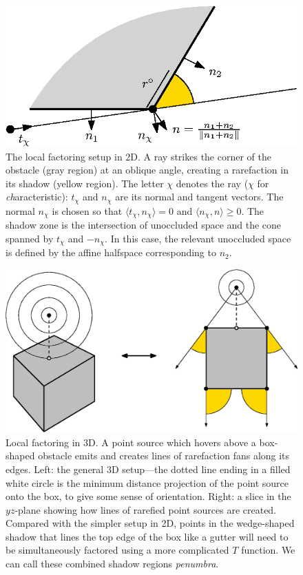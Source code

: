 \documentclass{article}
\begin{document}
\begin{figure}[t]
  \centering
  \includegraphics{2d-factoring.eps}
  \caption{The local factoring setup in 2D. A ray strikes the corner
    of the obstacle (gray region) at an oblique angle, creating a
    rarefaction in its shadow (yellow region). The letter $\chi$
    denotes the ray ($\chi$ for \emph{ch}aracteristic): $t_\chi$ and
    $n_\chi$ are its normal and tangent vectors. The normal $n_\chi$
    is chosen so that $\langle t_\chi, n_\chi \rangle = 0$ and
    $\langle n_\chi, n \rangle \geq 0$. The shadow zone is the
    intersection of unoccluded space and the cone spanned by $t_\chi$
    and $-n_\chi$. In this case, the relevant unoccluded space is
    defined by the affine halfspace corresponding to
    $n_2$.}\label{fig:2d-factoring}
\end{figure}

\begin{figure}[t]
  \centering
  \includegraphics[width=0.8\linewidth]{3d-factoring.eps}
  \caption{Local factoring in 3D. A point source which hovers above a
    box-shaped obstacle emits and creates lines of rarefaction fans
    along its edges. Left: the general 3D setup---the dotted line
    ending in a filled white circle is the minimum distance projection
    of the point source onto the box, to give some sense of
    orientation. Right: a slice in the $yz$-plane showing how lines of
    rarefied point sources are created. Compared with the simpler
    setup in 2D, points in the wedge-shaped shadow that lines the top
    edge of the box like a gutter will need to be simultaneously
    factored using a more complicated $T$ function. We can call these
    combined shadow regions \emph{penumbra}.}\label{fig:3d-factoring}
\end{figure}
\end{document}
